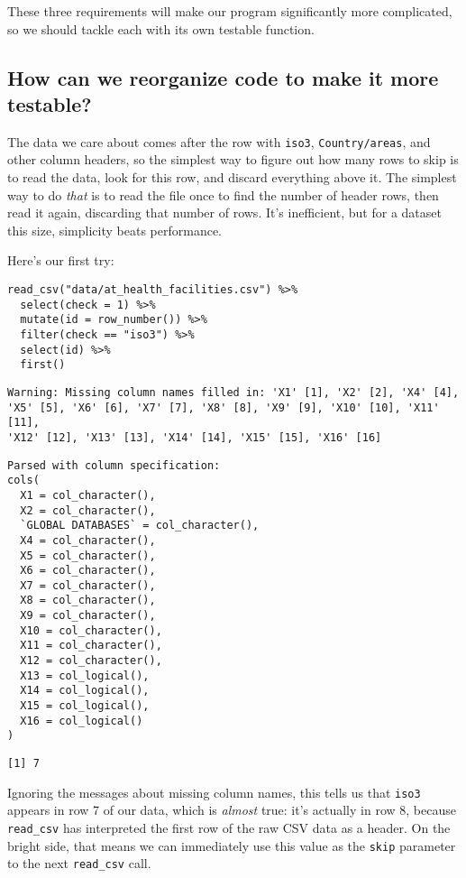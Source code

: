 \noindent
These three requirements will make our program significantly more complicated,
so we should tackle each with its own testable function.

\subsection*{How can we reorganize code to make it more testable?}

The data we care about comes
after the row with \texttt{iso3}, \texttt{Country/areas}, and other column headers,
so the simplest way to figure out how many rows to skip is to read the data,
look for this row,
and discard everything above it.
The simplest way to do \emph{that} is to read the file once to find the number of header rows,
then read it again,
discarding that number of rows.
It's inefficient,
but for a dataset this size,
simplicity beats performance.

Here's our first try:

\begin{lstlisting}
read_csv("data/at_health_facilities.csv") %>%
  select(check = 1) %>%
  mutate(id = row_number()) %>%
  filter(check == "iso3") %>%
  select(id) %>%
  first()
\end{lstlisting}

\begin{lstlisting}
Warning: Missing column names filled in: 'X1' [1], 'X2' [2], 'X4' [4],
'X5' [5], 'X6' [6], 'X7' [7], 'X8' [8], 'X9' [9], 'X10' [10], 'X11' [11],
'X12' [12], 'X13' [13], 'X14' [14], 'X15' [15], 'X16' [16]
\end{lstlisting}

\begin{lstlisting}
Parsed with column specification:
cols(
  X1 = col_character(),
  X2 = col_character(),
  `GLOBAL DATABASES` = col_character(),
  X4 = col_character(),
  X5 = col_character(),
  X6 = col_character(),
  X7 = col_character(),
  X8 = col_character(),
  X9 = col_character(),
  X10 = col_character(),
  X11 = col_character(),
  X12 = col_character(),
  X13 = col_logical(),
  X14 = col_logical(),
  X15 = col_logical(),
  X16 = col_logical()
)
\end{lstlisting}

\begin{lstlisting}
[1] 7
\end{lstlisting}

\noindent
Ignoring the messages about missing column names,
this tells us that \texttt{iso3} appears in row 7 of our data,
which is \emph{almost} true:
it's actually in row 8,
because \texttt{read\_csv} has interpreted the first row of the raw CSV data as a header.
On the bright side,
that means we can immediately use this value as the \texttt{skip} parameter to the next \texttt{read\_csv} call.

